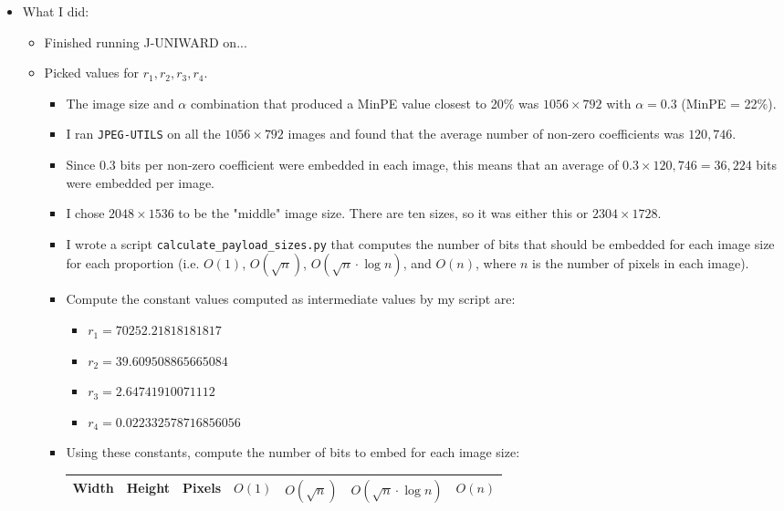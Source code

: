 \documentclass[11pt,a4paper]{report}
\begin{document}
\begin{itemize}

  \item What I did:
    \begin{itemize}
      \item Finished running J-UNIWARD on...
      \item Picked values for $r_1, r_2, r_3, r_4$.
        \begin{itemize}
          \item The image size and $\alpha$ combination that produced a MinPE value closest to 20\% was $1056\times792$ with $\alpha=0.3$ (MinPE = 22\%).
          \item I ran \texttt{JPEG-UTILS} on all the $1056\times792$ images and found that the average number of non-zero coefficients was $120,746$.
          \item Since 0.3 bits per non-zero coefficient were embedded in each image, this means that an average of $0.3 \times 120,746 = 36,224$ bits were embedded per image.
          \item I chose $2048 \times 1536$ to be the "middle" image size. There are ten sizes, so it was either this or $2304 \times 1728$.
          \item I wrote a script \texttt{calculate\_payload\_sizes.py} that computes the number of bits that should be embedded for each image size for each proportion (i.e. $O(1)$, $O(\sqrt{n})$, $O(\sqrt{n} \cdot \log n)$, and $O(n)$, where $n$ is the number of pixels in each image).
          \item Compute the constant values computed as intermediate values by my script are:
            \begin{itemize}
              \item $r_1 = 70252.21818181817$
              \item $r_2 = 39.609508865665084$
              \item $r_3 = 2.64741910071112$
              \item $r_4 = 0.022332578716856056$
            \end{itemize}
          \item Using these constants, compute the number of bits to embed for each image size:
          \begin{center}
            \begin{tabular}{ c c c | c c c c }
            Width & Height & Pixels & $O(1)$ & $O(\sqrt{n})$ & $O(\sqrt{n} \cdot \log n)$ & $O(n)$ \\ \hline

\end{tabular}
\end{center}
\end{itemize}
\end{itemize}
\end{itemize}
\end{document}
